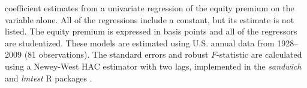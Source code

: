 {\begin{table}[tb]
{      coefficient estimates from a univariate regression of the equity premium
      on the variable alone. All of the regressions include a constant, but
      its estimate is not listed. The equity premium is expressed in basis
      points and all of the regressors are studentized.
      These models are estimated using U.S. annual data from 1928--2009
      (81 observations). The standard errors and robust $F$-statistic
      are calculated using a Newey-West HAC estimator with two lags,
      implemented in the \emph{sandwich} and \emph{lmtest} R packages
      \protect\citep{NeW:87,ZeH:02,Zei:04}.}
    \label{tab:gwinsample}
  \end{table}
}


